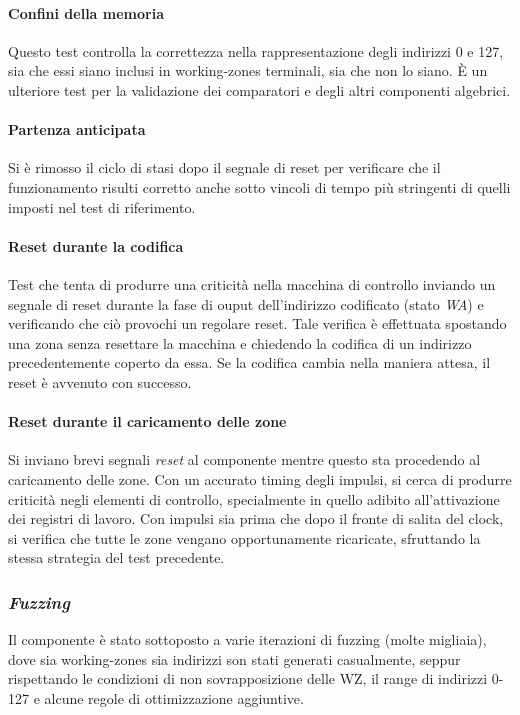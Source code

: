 \documentclass[11pt,a4paper]{article}
\begin{document}
\paragraph{Confini della memoria}
Questo test controlla la correttezza nella rappresentazione degli indirizzi 0 e 127, sia che essi siano inclusi in working-zones terminali, sia che non lo
siano. È un ulteriore test per la validazione dei comparatori e degli altri componenti algebrici.

\paragraph{Partenza anticipata}
Si è rimosso il ciclo di stasi dopo il segnale di reset per verificare che il funzionamento risulti corretto anche sotto vincoli di tempo più stringenti di
quelli imposti nel test di riferimento.

\paragraph{Reset durante la codifica}
Test che tenta di produrre una criticità nella macchina di controllo inviando un segnale di reset durante la fase di ouput dell'indirizzo codificato (stato
\emph{WA}) e verificando che ciò provochi un regolare reset. Tale verifica è effettuata spostando una zona senza resettare la macchina e chiedendo la
codifica di un indirizzo precedentemente coperto da essa. Se la codifica cambia nella maniera attesa, il reset è avvenuto con successo.

\paragraph{Reset durante il caricamento delle zone}
Si inviano brevi segnali \emph{reset} al componente mentre questo sta procedendo al caricamento delle zone. Con un accurato timing degli impulsi, si cerca
di produrre criticità negli elementi di controllo, specialmente in quello adibito all'attivazione dei registri di lavoro. Con impulsi sia prima che dopo
il fronte di salita del clock, si verifica che tutte le zone vengano opportunamente ricaricate, sfruttando la stessa strategia del test precedente.

\subsubsection{\emph{Fuzzing}}
Il componente è stato sottoposto a varie iterazioni di fuzzing (molte migliaia), dove sia working-zones sia indirizzi son stati generati casualmente,
seppur rispettando le condizioni di non sovrapposizione delle WZ, il range di indirizzi 0-127 e alcune regole di ottimizzazione aggiuntive.
\end{document}
